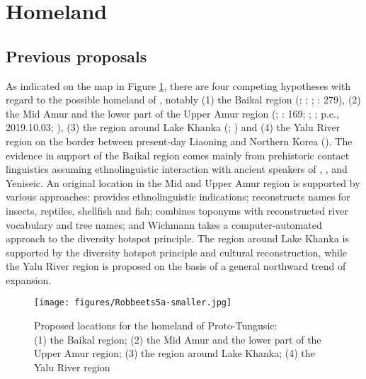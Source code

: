 \documentclass[output=paper,colorlinks,citecolor=brown]{langscibook}
\begin{document}
\section{Homeland}\label{Section8.4}

\subsection{Previous proposals}\label{Section8.4.1}

As indicated on the map in Figure \ref{fig:8:5}, there are four competing hypotheses with regard to the possible homeland of , notably (1) the Baikal region (\citealt{Vasilevič1960}; \citealt[23]{Menges1968}; \citealt{Derevyanko1976}; \citealt{Helimski1985}: 279), (2) the Mid Amur and the lower part of the Upper Amur region (\citealt{Tugolukov1980}; \citealt{Janhunen1996RO}: 169; \citealt{Korovina2011}; \citealt{Pevnov2012};  p.c., 2019.10.03; \citealt{Pugach2016}), (3) the region around Lake Khanka (\citealt{Robbeets2020}; \citealt{WangRobbeets2020}) and (4) the Yalu River region on the border between present-day Liaoning and Northern Korea (\citealt{Janhunen2012a}). The evidence in support of the Baikal region comes mainly from prehistoric contact linguistics assuming ethnolinguistic interaction with ancient speakers of , ,  and Yeniseic. An original location in the Mid and Upper Amur region is supported by various approaches: \citet[169]{Janhunen1996RO} provides ethnolinguistic indications; \citet{Korovina2011} reconstructs names for insects, reptiles, shellfish and fish; \citet{Pevnov2012} combines toponyms with reconstructed river vocabulary and tree names; and Wichmann takes a computer-automated approach to the diversity hotspot principle. The region around Lake Khanka is supported by the diversity hotspot principle and cultural reconstruction, while the Yalu River region is proposed on the basis of a general northward trend of expansion.

\vfill
\begin{figure}[H]
\texttt{[image: figures/Robbeets5a-smaller.jpg]}
\caption{Proposed locations for the homeland of Proto-Tungusic:\\ (1) the Baikal region; (2) the Mid Amur and the lower part of the Upper Amur region; (3) the region around Lake Khanka; (4) the Yalu River region}
\label{fig:8:5}
\end{figure}
\vfill\pagebreak
\end{document}

